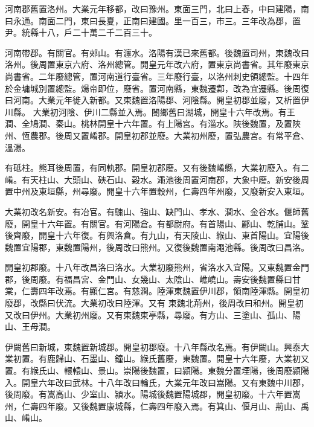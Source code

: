 
\begin{pinyinscope}

 河南郡舊置洛州。大業元年移都，改曰豫州。東面三門，北曰上春，中曰建陽，南曰永通。南面二門，東曰長夏，正南曰建國。里一百三，市三。三年改為郡，置尹。統縣十八，戶二十萬二千二百三十。



 河南帶郡。有關官。有郟山。有瀍水。洛陽有漢已來舊都。後魏置司州，東魏改曰洛州。後周置東京六府、洛州總管。開皇元年改六府，置東京尚書省。其年廢東京尚書省。二年廢總管，置河南道行臺省。三年廢行臺，以洛州刺史領總監。十四年於金墉城別置總監。煬帝即位，廢省。置河南縣，東魏遷鄴，改為宜遷縣。後周復曰河南。大業元年徙入新都。又東魏置洛陽郡、河陰縣。開皇初郡並廢，又析置伊川縣。
 大業初河陰、伊川二縣並入焉。閿鄉舊曰湖城，開皇十六年改焉。有王澗、全鳩澗、秦山。桃林開皇十六年置。有上陽宮。有淄水。陜後魏置，及置陜州、恆農郡。後周又置崤郡。開皇初郡並廢。大業初州廢，置弘農宮。有常平倉、溫湯。



 有砥柱。熊耳後周置，有同軌郡。開皇初郡廢。又有後魏崤縣，大業初廢入。有二崤。有天柱山、大頭山、硤石山、穀水。澠池後周置河南郡，大象中廢。新安後周置中州及東垣縣，州尋廢。開皇十六年置穀州，仁壽四年州廢，又廢新安入東垣。



 大業初改名新安。有冶官。有騩山、強山、缺門山、孝水、澗水、金谷水。偃師舊廢，開皇十六年置。有關官。有河陽倉。有都尉府。有首陽山、酈山、乾脯山。鞏後齊廢，開皇十六年復。有興洛倉。有九山，有天陵山、緱山、東首陽山。宜陽後魏置宜陽郡，東魏置陽州，後周改曰熊州。又復後魏置南澠池縣。後周改曰昌洛。



 開皇初郡廢。十八年改昌洛曰洛水。大業初廢熊州，省洛水入宜陽。又東魏置金門郡，後周廢。有福昌宮、金門山、女幾山、太陰山、嶕嶢山。壽安後魏置縣曰甘棠，仁壽四年改焉。有顯仁宮。有慈澗。陸渾東魏置伊川郡，領南陸渾縣。開皇初廢郡，改縣曰伏流。大業初改曰陸渾。又有
 東魏北荊州，後周改曰和州。開皇初又改曰伊州。大業初州廢。又有東魏東亭縣，尋廢。有方山、三塗山、孤山、陽山、王母澗。



 伊闕舊曰新城，東魏置新城郡。開皇初郡廢。十八年縣改名焉。有伊闕山。興泰大業初置。有鹿歸山、石墨山、鐘山。緱氏舊廢，東魏置。開皇十六年廢，大業初又置。有緱氏山、轘轅山、景山。崇陽後魏置，曰潁陽。東魏分置堙陽，後周廢潁陽入。開皇六年改曰武林。十八年改曰輪氏，大業元年改曰嵩陽。又有東魏中川郡，後周廢。有嵩高山、少室山、潁水。陽城後魏置陽城郡，開皇初廢。十六年置嵩州，仁壽四年廢。又後魏置康城縣，仁壽四年廢入焉。有箕山、偃月山、荊山、禹山、崤山。




\end{pinyinscope}
